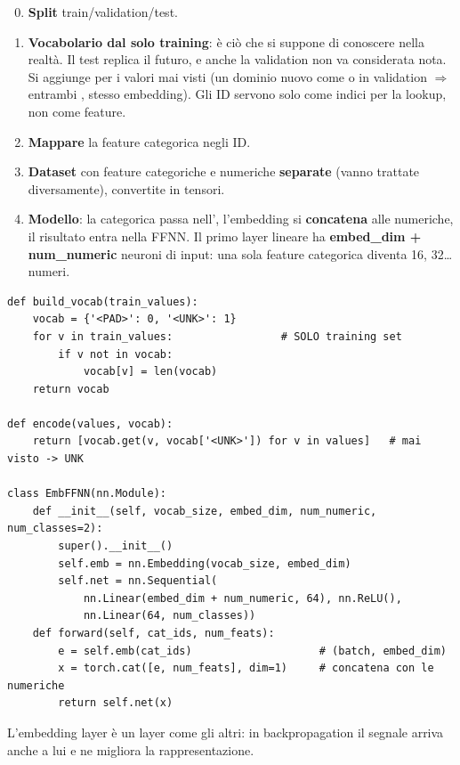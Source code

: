 \begin{enumerate}
  \setcounter{enumi}{-1}
  \item \textbf{Split} train/validation/test.
  \item \textbf{Vocabolario dal solo training}: è ciò che si suppone di conoscere nella realtà. Il test replica il futuro, e anche la validation
        non va considerata nota. Si aggiunge  per i valori mai visti (un dominio nuovo come  o  in
        validation $\Rightarrow$ entrambi , stesso embedding). Gli ID servono solo come indici per la lookup, non come feature.
  \item \textbf{Mappare} la feature categorica negli ID.
  \item \textbf{Dataset} con feature categoriche e numeriche \textbf{separate} (vanno trattate diversamente), convertite in tensori.
  \item \textbf{Modello}: la categorica passa nell', l'embedding si \textbf{concatena} alle numeriche, il risultato entra nella FFNN.
        Il primo layer lineare ha \textbf{embed\_dim + num\_numeric} neuroni di input: una sola feature categorica diventa 16, 32\ldots numeri.
\end{enumerate}

\begin{lstlisting}
def build_vocab(train_values):
    vocab = {'<PAD>': 0, '<UNK>': 1}
    for v in train_values:                 # SOLO training set
        if v not in vocab:
            vocab[v] = len(vocab)
    return vocab

def encode(values, vocab):
    return [vocab.get(v, vocab['<UNK>']) for v in values]   # mai visto -> UNK

class EmbFFNN(nn.Module):
    def __init__(self, vocab_size, embed_dim, num_numeric, num_classes=2):
        super().__init__()
        self.emb = nn.Embedding(vocab_size, embed_dim)
        self.net = nn.Sequential(
            nn.Linear(embed_dim + num_numeric, 64), nn.ReLU(),
            nn.Linear(64, num_classes))
    def forward(self, cat_ids, num_feats):
        e = self.emb(cat_ids)                    # (batch, embed_dim)
        x = torch.cat([e, num_feats], dim=1)     # concatena con le numeriche
        return self.net(x)
\end{lstlisting}
L'embedding layer è un layer come gli altri: in backpropagation il segnale arriva anche a lui e ne migliora la rappresentazione.

